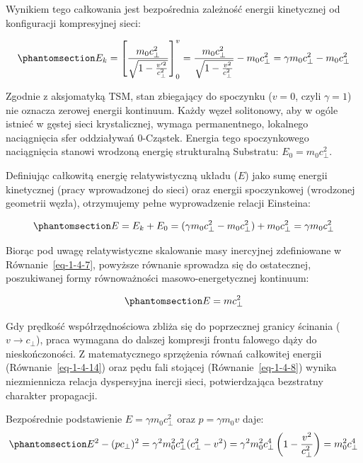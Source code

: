 \documentclass[
  polish,
  letterpaper,
  DIV=11,
  numbers=noendperiod,
  oneside]{scrartcl}
\begin{document}
Wynikiem tego całkowania jest bezpośrednia zależność energii kinetycznej
od konfiguracji kompresyjnej sieci:

\begin{equation}\protect\phantomsection\label{eq-1-4-13}{E_k = \left[ \frac{m_0 c_{\perp}^2}{\sqrt{1 - \frac{v'^2}{c_{\perp}^2}}} \right]_0^v = \frac{m_0 c_{\perp}^2}{\sqrt{1 - \frac{v^2}{c_{\perp}^2}}} - m_0 c_{\perp}^2 = \gamma m_0 c_{\perp}^2 - m_0 c_{\perp}^2}\end{equation}

Zgodnie z aksjomatyką TSM, stan zbiegający do spoczynku (\(v=0\), czyli
\(\gamma=1\)) nie oznacza zerowej energii kontinuum. Każdy węzeł
solitonowy, aby w ogóle istnieć w gęstej sieci krystalicznej, wymaga
permanentnego, lokalnego naciągnięcia sfer oddziaływań 0-Cząstek.
Energia tego spoczynkowego naciągnięcia stanowi wrodzoną energię
strukturalną Substratu: \(E_0 = m_0 c_{\perp}^2\).

Definiując całkowitą energię relatywistyczną układu (\(E\)) jako sumę
energii kinetycznej (pracy wprowadzonej do sieci) oraz energii
spoczynkowej (wrodzonej geometrii węzła), otrzymujemy pełne
wyprowadzenie relacji Einsteina:

\begin{equation}\protect\phantomsection\label{eq-1-4-14}{E = E_k + E_0 = (\gamma m_0 c_{\perp}^2 - m_0 c_{\perp}^2) + m_0 c_{\perp}^2 = \gamma m_0 c_{\perp}^2}\end{equation}

Biorąc pod uwagę relatywistyczne skalowanie masy inercyjnej zdefiniowane
w Równanie~\ref{eq-1-4-7}, powyższe równanie sprowadza się do
ostatecznej, poszukiwanej formy równoważności masowo-energetycznej
kontinuum:

\begin{equation}\protect\phantomsection\label{eq-1-4-15}{E = m c_{\perp}^2}\end{equation}

Gdy prędkość współrzędnościowa zbliża się do poprzecznej granicy
ścinania (\(v \to c_{\perp}\)), praca wymagana do dalszej kompresji
frontu falowego dąży do nieskończoności. Z matematycznego sprzężenia
równań całkowitej energii (Równanie~\ref{eq-1-4-14}) oraz pędu fali
stojącej (Równanie~\ref{eq-1-4-8}) wynika niezmiennicza relacja
dyspersyjna inercji sieci, potwierdzająca bezstratny charakter
propagacji.

Bezpośrednie podstawienie \(E=\gamma m_0 c_\perp^2\) oraz
\(p=\gamma m_0 v\) daje:
\begin{equation}\protect\phantomsection\label{eq-1-4-16przed}{E^2-(pc_\perp)^2=\gamma^2 m_0^2 c_\perp^2(c_\perp^2-v^2)=\gamma^2 m_0^2 c_\perp^4\left(1-\frac{v^2}{c_\perp^2}\right)=m_0^2c_\perp^4}\end{equation}
\end{document}
